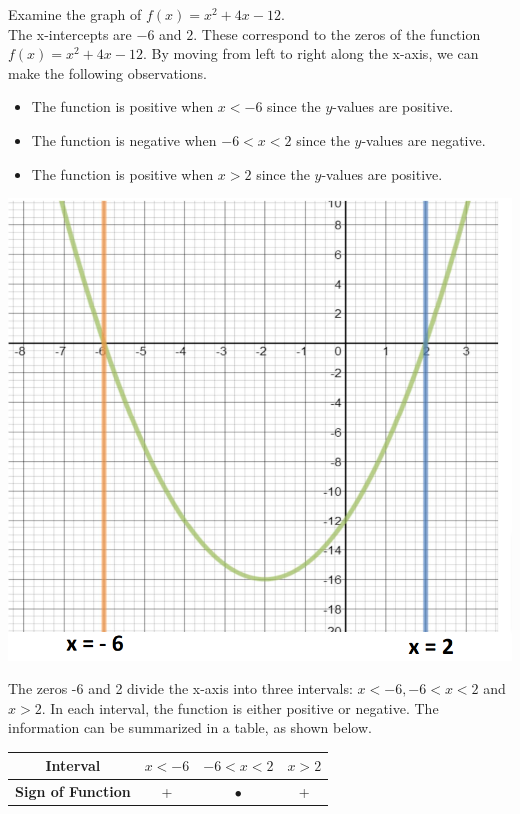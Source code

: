 \documentclass{article}
\begin{document}
\begin{minipage}{0.6\textwidth}
Examine the graph of $f(x)=x^2+4x-12$.\\
The x-intercepts are $-6$ and $2$. These correspond to the zeros of the function $f(x)=x^2+4x-12$. By moving from left to right along the x-axis, we can make the following observations.
\begin{itemize}
    \item The function is positive when $x < -6$ since the $y$-values are positive.
    \item The function is negative when $-6 < x < 2$ since the $y$-values are negative.
    \item The function is positive when $x > 2$ since the $y$-values are positive.
\end{itemize}
\end{minipage}%
\vspace{1em}
\begin{minipage}{0.4\textwidth}
\centering
\includegraphics[width=\textwidth]{imgs/graph x^2+4x-12.png}
\end{minipage}

The zeros -6 and 2 divide the x-axis into three intervals: $x < -6, -6 < x < 2$ and $x > 2$. In each interval, the function is either positive or negative. The information can be summarized in a table,
as shown below.     

\begin{table}[ht]
\centering
\begin{tabular}{|c|c|c|c|}
\hline
\textbf{Interval} & $x < -6$ & $-6 < x < 2$ & $x > 2$ \\
\hline
\textbf{Sign of Function} & + & $\bullet$ & + \\
\hline
\end{tabular}
\end{table}
\end{document}
